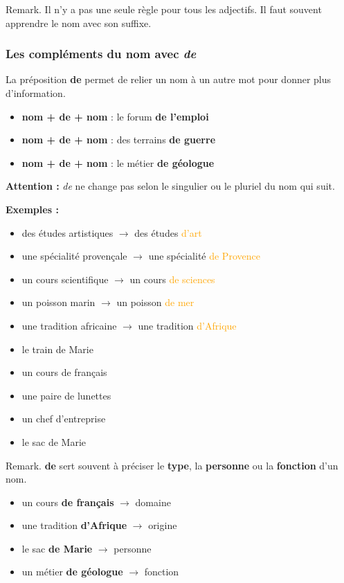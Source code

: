 \documentclass[math,code]{amznotes}
\theoremstyle{remark}
\begin{document}
\begin{notebox}
    Remark. Il n'y a pas une seule règle pour tous les adjectifs. Il faut souvent apprendre le nom avec son suffixe.
\end{notebox}

\subsubsection*{Les compléments du nom avec \textit{de}}

La préposition \textbf{de} permet de relier un nom à un autre mot pour donner plus d'information.

\begin{itemize}
    \item \textbf{nom + de + nom} : le forum \textbf{de l'emploi}
    \item \textbf{nom + de + nom} : des terrains \textbf{de guerre}
    \item \textbf{nom + de + nom} : le métier \textbf{de géologue}
\end{itemize}

\begin{notebox}
\textbf{Attention :} \textit{de} ne change pas selon le singulier ou le pluriel
du nom qui suit.
\end{notebox}

\textbf{Exemples :}
\begin{itemize}
    \item des études artistiques $\rightarrow$ des études \textcolor{orange}{d'art}
    \item une spécialité provençale $\rightarrow$ une spécialité \textcolor{orange}{de Provence}
    \item un cours scientifique $\rightarrow$ un cours \textcolor{orange}{de sciences}
    \item un poisson marin $\rightarrow$ un poisson \textcolor{orange}{de mer}
    \item une tradition africaine $\rightarrow$ une tradition \textcolor{orange}{d'Afrique}
    \item le train de Marie
    \item un cours de français
    \item une paire de lunettes
    \item un chef d'entreprise
    \item le sac de Marie
\end{itemize}

\begin{notebox}
    Remark. \textbf{de} sert souvent à préciser le \textbf{type}, la \textbf{personne} ou la \textbf{fonction} d'un nom.
    \begin{itemize}
        \item un cours \textbf{de français} $\rightarrow$ domaine
        \item une tradition \textbf{d'Afrique} $\rightarrow$ origine
        \item le sac \textbf{de Marie} $\rightarrow$ personne
        \item un métier \textbf{de géologue} $\rightarrow$ fonction
    \end{itemize}
\end{notebox}
\end{document}
